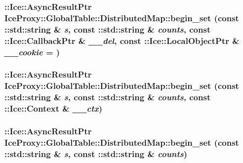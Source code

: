 \label{class_ice_proxy_1_1_global_table_1_1_distributed_map_ab88395a8799499c022f1edc1ac499de3}
\hypertarget{class_ice_proxy_1_1_global_table_1_1_distributed_map_aa56a333211b056d38326aa5e23c71fac}{
\subsubsection[{begin\_\-set}]{\setlength{\rightskip}{0pt plus 5cm}::Ice::AsyncResultPtr IceProxy::GlobalTable::DistributedMap::begin\_\-set (const ::std::string \& {\em s}, \/  const ::std::string \& {\em counts}, \/  const ::Ice::CallbackPtr \& {\em \_\-\_\-del}, \/  const ::Ice::LocalObjectPtr \& {\em \_\-\_\-cookie} = {})}}
\label{class_ice_proxy_1_1_global_table_1_1_distributed_map_aa56a333211b056d38326aa5e23c71fac}
\hypertarget{class_ice_proxy_1_1_global_table_1_1_distributed_map_a8cf9350ce04066ef0e71ce691d633527}{
\subsubsection[{begin\_\-set}]{\setlength{\rightskip}{0pt plus 5cm}::Ice::AsyncResultPtr IceProxy::GlobalTable::DistributedMap::begin\_\-set (const ::std::string \& {\em s}, \/  const ::std::string \& {\em counts}, \/  const ::Ice::Context \& {\em \_\-\_\-ctx})}}
\label{class_ice_proxy_1_1_global_table_1_1_distributed_map_a8cf9350ce04066ef0e71ce691d633527}
\hypertarget{class_ice_proxy_1_1_global_table_1_1_distributed_map_a362f376d77d5638e940aecc543faf8f3}{
\subsubsection[{begin\_\-set}]{\setlength{\rightskip}{0pt plus 5cm}::Ice::AsyncResultPtr IceProxy::GlobalTable::DistributedMap::begin\_\-set (const ::std::string \& {\em s}, \/  const ::std::string \& {\em counts})}}
